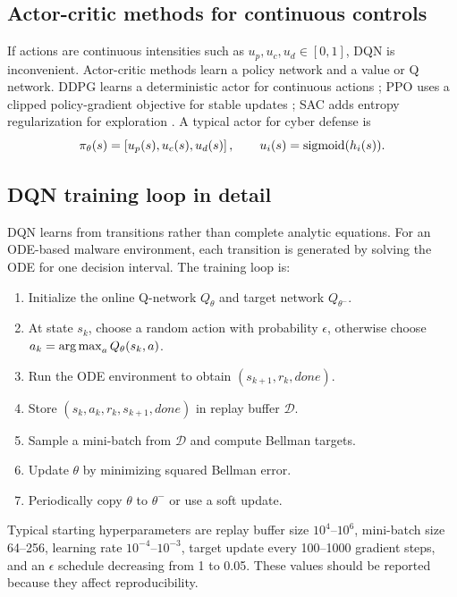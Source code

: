 \documentclass[11pt,a4paper]{article}
\begin{document}
\subsection{Actor-critic methods for continuous controls}
If actions are continuous intensities such as $u_p,u_c,u_d\in[0,1]$, DQN is inconvenient. Actor-critic methods learn a policy network and a value or Q network. DDPG learns a deterministic actor for continuous actions \cite{lillicrap2015}; PPO uses a clipped policy-gradient objective for stable updates \cite{schulman2017}; SAC adds entropy regularization for exploration \cite{haarnoja2018}. A typical actor for cyber defense is
\begin{equation}
\pi_\theta(s)=\left[u_p(s),u_c(s),u_d(s)\right],\qquad u_i(s)=\operatorname{sigmoid}(h_i(s)).
\end{equation}



\subsection{DQN training loop in detail}
DQN learns from transitions rather than complete analytic equations. For an ODE-based malware environment, each transition is generated by solving the ODE for one decision interval. The training loop is:
\begin{enumerate}
\item Initialize the online Q-network $Q_\theta$ and target network $Q_{\theta^-}$.
\item At state $s_k$, choose a random action with probability $\epsilon$, otherwise choose $a_k=\operatorname*{arg\,max}_aQ_\theta(s_k,a)$.
\item Run the ODE environment to obtain $(s_{k+1},r_k,done)$.
\item Store $(s_k,a_k,r_k,s_{k+1},done)$ in replay buffer $\mathcal{D}$.
\item Sample a mini-batch from $\mathcal{D}$ and compute Bellman targets.
\item Update $\theta$ by minimizing squared Bellman error.
\item Periodically copy $\theta$ to $\theta^-$ or use a soft update.
\end{enumerate}
Typical starting hyperparameters are replay buffer size $10^4$--$10^6$, mini-batch size 64--256, learning rate $10^{-4}$--$10^{-3}$, target update every 100--1000 gradient steps, and an $\epsilon$ schedule decreasing from 1 to 0.05. These values should be reported because they affect reproducibility.
\end{document}
